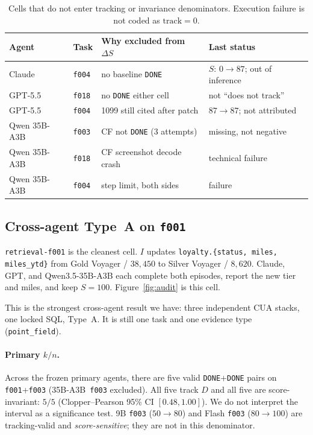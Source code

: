\documentclass[11pt]{article}
\newcommand{\task}[1]{\texttt{#1}}
\begin{document}
\begin{table}[t]
\centering
\small
\setlength{\tabcolsep}{4pt}
\begin{tabular}{@{}ll l l@{}}
\toprule
Agent & Task & Why excluded from $\Delta S$ & Last status \\
\midrule
Claude & \task{f004} & no baseline \texttt{DONE} & $S$: $0\to 87$; out of inference \\
GPT-5.5 & \task{f018} & no \texttt{DONE} either cell & not ``does not track'' \\
GPT-5.5 & \task{f004} & 1099 still cited after patch & $87\to 87$; not attributed \\
Qwen 35B-A3B & \task{f003} & CF not \texttt{DONE} (3 attempts) & missing, not negative \\
Qwen 35B-A3B & \task{f018} & CF screenshot decode crash & technical failure \\
Qwen 35B-A3B & \task{f004} & step limit, both sides & failure \\
\bottomrule
\end{tabular}
\caption{Cells that do not enter tracking or invariance denominators.
Execution failure is not coded as $\mathrm{track}=0$.}
\label{tab:fail}
\end{table}

\subsection{Cross-agent Type~A on \task{f001}}
\label{sec:f001}

\task{retrieval-f001} is the cleanest cell. $I$ updates
\texttt{loyalty.\{status, miles, miles\_ytd\}} from Gold Voyager /
$38{,}450$ to Silver Voyager / $8{,}620$. Claude, GPT, and
Qwen3.5-35B-A3B each complete both episodes, report the new tier and
miles, and keep $S=100$. Figure~\ref{fig:audit} is this cell.

This is the strongest cross-agent result we have: three independent CUA
stacks, one locked SQL, Type~A. It is still one task and one evidence
type (\texttt{point\_field}).

\paragraph{Primary $k/n$.}
Across the frozen primary agents, there are five valid
\texttt{DONE}+\texttt{DONE} pairs on \task{f001}+\task{f003}
(35B-A3B~\task{f003} excluded). All five track $D$ and all five are
score-invariant: $5/5$ (Clopper--Pearson 95\% CI $[0.48,1.00]$).
We do not interpret the interval as a significance test. 9B
\task{f003} ($50\to 80$) and Flash \task{f003} ($80\to 100$) are
tracking-valid and \emph{score-sensitive}; they are not in this
denominator.
\end{document}
